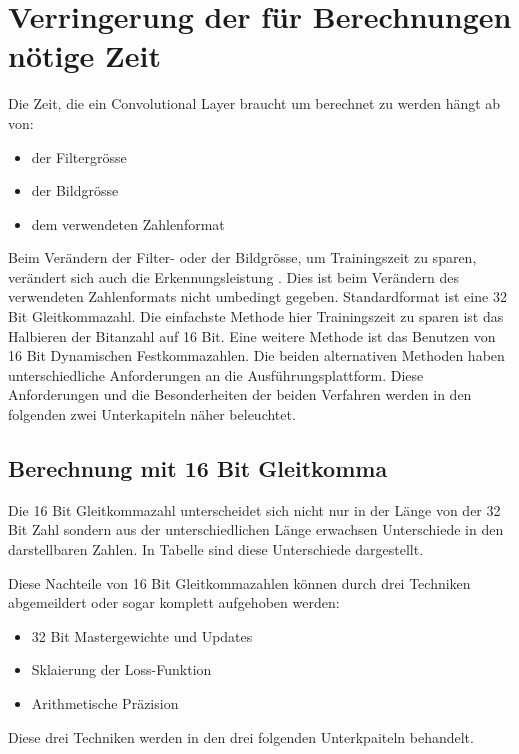 \section{Verringerung der für Berechnungen nötige Zeit}

Die Zeit, die ein Convolutional Layer braucht um berechnet zu werden hängt ab von:
\begin{itemize}
 \item der Filtergr\"osse
 \item der Bildgr\"osse
 \item dem verwendeten Zahlenformat
\end{itemize}
Beim Verändern der Filter- oder der Bildgr\"osse, um Trainingszeit zu sparen, ver\"andert sich auch die Erkennungsleistung . Dies ist beim Verändern des verwendeten Zahlenformats nicht umbedingt gegeben. Standardformat ist eine 32 Bit Gleitkommazahl. Die einfachste Methode hier Trainingszeit zu sparen ist das Halbieren der Bitanzahl auf 16 Bit. Eine weitere Methode ist das Benutzen von 16 Bit Dynamischen Festkommazahlen.
Die beiden alternativen Methoden haben unterschiedliche Anforderungen an die Ausführungsplattform. Diese Anforderungen und die Besonderheiten der beiden Verfahren werden in den folgenden zwei Unterkapiteln näher beleuchtet.


\subsection{Berechnung mit 16 Bit Gleitkomma}

Die 16 Bit Gleitkommazahl unterscheidet sich nicht nur in der Länge von der 32 Bit Zahl sondern aus der unterschiedlichen Länge erwachsen Unterschiede in den darstellbaren Zahlen. In Tabelle  sind diese Unterschiede dargestellt.





Diese Nachteile von 16 Bit Gleitkommazahlen können durch drei Techniken abgemeildert oder sogar komplett aufgehoben werden:
\begin{itemize}
 \item 32 Bit Mastergewichte und Updates
 \item Sklaierung der Loss-Funktion
 \item Arithmetische Präzision 
\end{itemize}

Diese drei Techniken werden in den drei folgenden Unterkpaiteln behandelt.

